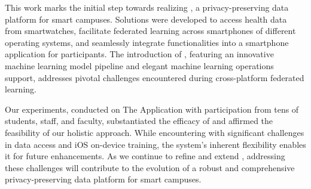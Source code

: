 This work marks the initial step towards realizing \fedcampus,
a privacy-preserving data platform for smart campuses.
Solutions were developed to access health data from smartwatches,
facilitate federated learning across smartphones of different operating systems,
and seamlessly integrate functionalities into a smartphone application for
participants. The introduction of \fedkit,
featuring an innovative machine learning model pipeline and elegant machine
learning operations support,
addresses pivotal challenges encountered during cross-platform federated
learning.

Our experiments,
conducted on The \fedcampus Application with participation from tens of
students, staff, and faculty,
substantiated the efficacy of \fedkit and affirmed the feasibility of our
holistic approach.
While encountering with significant challenges in data access and iOS on-device
training,
the system's inherent flexibility enables it for future enhancements.
As we continue to refine and extend \fedcampus,
addressing these challenges will contribute to the evolution of a robust and
comprehensive privacy-preserving data platform for smart campuses.
